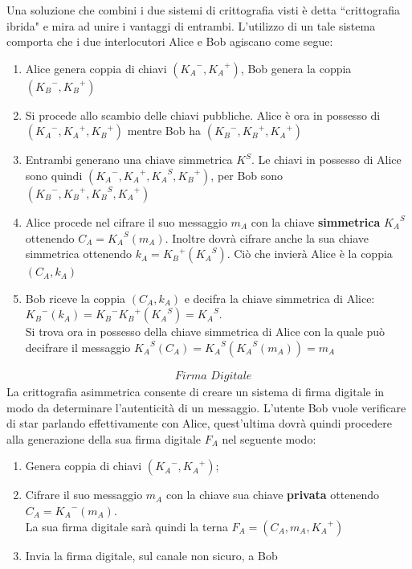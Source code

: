 \documentclass[a4paper,12pt]{tesiinfo}
\begin{document}
Una soluzione che combini i due sistemi di crittografia visti \`e detta ``crittografia ibrida" e mira ad unire i vantaggi di entrambi. L'utilizzo di un tale sistema comporta che i due interlocutori Alice e Bob agiscano come segue:
\begin{enumerate}
  \item Alice genera coppia di chiavi $({K_A}^-, {K_A}^+)$, Bob genera la coppia $({K_B}^-, {K_B}^+)$
  \item Si procede allo scambio delle chiavi pubbliche. Alice \`e ora in possesso di $({K_A}^-, {K_A}^+, {K_B}^+)$ mentre Bob ha $({K_B}^-, {K_B}^+, {K_A}^+)$
  \item Entrambi generano una chiave simmetrica $K^S$. Le chiavi in possesso di Alice sono quindi $({K_A}^-, {K_A}^+, {K_A}^S, {K_B}^+)$, per Bob sono $({K_B}^-, {K_B}^+, {K_B}^S, {K_A}^+)$
  \item Alice procede nel cifrare il suo messaggio $m_A$ con la chiave \textbf{simmetrica} ${K_A}^S$ ottenendo $C_A = {K_A}^S(m_A)$. Inoltre dovr\`a cifrare anche la sua chiave simmetrica ottenendo $k_A={K_B}^+({K_A}^S)$. Ci\`o che invier\`a Alice \`e la coppia $(C_A, k_A)$
  \item Bob riceve la coppia $(C_A, k_A)$ e decifra la chiave simmetrica di Alice:\\ ${K_B}^-(k_A)={K_B}^-{K_B}^+({K_A}^S)={K_A}^S$. \\Si trova ora in possesso della chiave simmetrica di Alice con la quale pu\`o decifrare il messaggio ${K_A}^S(C_A)={K_A}^S({K_A}^S(m_A))=m_A$
\end{enumerate}
%
%
%
\begin{align*}
&\textit{Firma Digitale}
\end{align*}
La crittografia asimmetrica consente di creare un sistema di firma digitale in modo da determinare l'autenticit\`a di un messaggio. L'utente Bob vuole verificare di star parlando effettivamente con Alice, quest'ultima dovr\`a quindi procedere alla generazione della sua firma digitale $F_A$ nel seguente modo: 
\begin{enumerate}
  \item Genera coppia di chiavi $({K_A}^-, {K_A}^+)$;
  \item Cifrare il suo messaggio $m_A$ con la chiave sua chiave \textbf{privata} ottenendo \\$C_A = {K_A}^-(m_A)$. \\La sua firma digitale sar\`a quindi la terna $F_A = (C_A, m_A, {K_A}^+)$
  \item Invia la firma digitale, sul canale non sicuro, a Bob
\end{enumerate}
\end{document}
